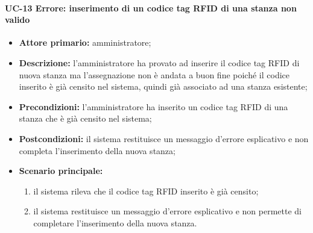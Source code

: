 \paragraph{UC-13 Errore: inserimento di un codice tag RFID di una stanza non valido}
\begin{itemize}
	\item \textbf{Attore primario:} amministratore;
	\item \textbf{Descrizione:} l'amministratore ha provato ad inserire il codice tag RFID di nuova stanza ma l'assegnazione non è andata a buon fine poiché il codice inserito è già censito nel sistema, quindi già associato ad una stanza esistente;
	\item \textbf{Precondizioni:} l'amministratore ha inserito un codice tag RFID di una stanza che è già censito nel sistema;
	\item \textbf{Postcondizioni:} il sistema restituisce un messaggio d'errore esplicativo e non completa l'inserimento della nuova stanza;
	\item \textbf{Scenario principale:}
	      \begin{enumerate}
		      \item il sistema rileva che il codice tag RFID inserito è già censito; 
		      \item il sistema restituisce un messaggio d'errore esplicativo e non permette di completare l'inserimento della nuova stanza.
	      \end{enumerate}
\end{itemize}

